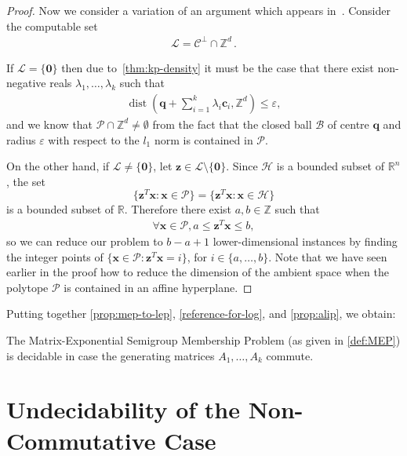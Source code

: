 \documentclass[format=acmsmall, review=false, screen=true]{acmart}
\newcommand{\cL}{{\mathcal{L}}}
\newcommand{\Reals}{\mathbb{R}}
\newcommand{\Integers}{\mathbb{Z}}
\newcommand{\myvector}{\boldsymbol}
\begin{document}
\begin{proof}
Now we consider a variation of an argument which appears in~\cite{KhachiyanP97}. Consider the computable set
\begin{align*}
\cL = \mathcal{C}^{\perp} \cap \Integers^{d} \, .
\end{align*}

If $\cL = \lbrace \myvector{0} \rbrace$ then due to~\cref{thm:kp-density} it must be the case that there exist non-negative reals $\lambda_{1}, \ldots, \lambda_{k}$ such that
\begin{align*}
\operatorname{dist} \left(\myvector{q} + \sum\limits_{i=1}^{k} \lambda_{i} \myvector{c}_{i}, \Integers^{d} \right) \leq \varepsilon ,
\end{align*}
and we know that $\mathcal{P} \cap \Integers^{d} \neq \emptyset$ from the fact that the closed ball $\mathcal{B}$ of centre $\myvector{q}$ and radius $\varepsilon$ with respect to the $l_{1}$ norm is contained in $\mathcal{P}$.

On the other hand, if
$\cL \neq \lbrace \myvector{0} \rbrace$, let
$\myvector{z} \in \cL \setminus \lbrace \myvector{0}
\rbrace$.
Since $\mathcal{H}$ is a bounded subset of $\Reals^n$, the set
\[ \lbrace \myvector{z}^T\myvector{x} : \myvector{x}\in \mathcal{P} \rbrace =
   \lbrace \myvector{z}^T\myvector{x} : \myvector{x}\in \mathcal{H} \rbrace \]
is a bounded subset of $\Reals$.
Therefore there exist
$a,b \in \Integers$ such that
\begin{align*}
\forall \myvector{x} \in \mathcal{P}, a \leq \myvector{z}^{T} \myvector{x} \leq b ,
\end{align*}
so we can reduce our problem to $b-a+1$ lower-dimensional instances
by finding the integer points of
$\lbrace \myvector{x} \in \mathcal{P} :
\myvector{z}^{T} \myvector{x} = i \rbrace$,
for $i \in \lbrace a, \ldots, b \rbrace$. Note that we have seen
earlier in the proof how to reduce the dimension of the ambient space
when the polytope $\mathcal{P}$ is contained in an affine
hyperplane.
\end{proof}

Putting together \cref{prop:mep-to-lep}, \cref{reference-for-log}, and \cref{prop:alip}, we obtain:
\begin{theorem}
The Matrix-Exponential Semigroup Membership Problem (as given in \cref{def:MEP}) is decidable in
case the generating matrices $A_1,\ldots,A_k$ commute.
\end{theorem}

\section{Undecidability of the Non-Commutative Case}
\label{sec:lics_encoding}
\end{document}

